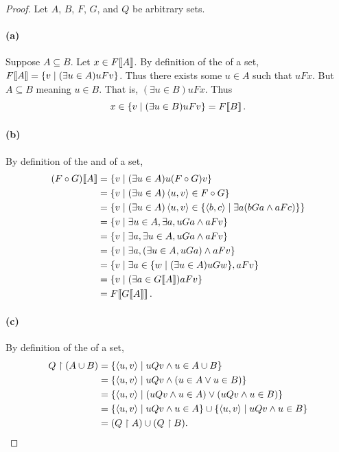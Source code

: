 \documentclass{report}
\begin{document}
  \begin{proof}
    Let $A$, $B$, $F$, $G$, and $Q$ be arbitrary sets.

    \paragraph{(a)}%

      Suppose $A \subseteq B$.
      Let $x \in F\!\left\llbracket A\right\rrbracket$.
      By definition of the  of a set,
        $F\!\left\llbracket A\right\rrbracket = \{v \mid (\exists u \in A) uFv\}$.
      Thus there exists some $u \in A$ such that $uFx$.
      But $A \subseteq B$ meaning $u \in B$.
      That is, $(\exists u \in B)uFx$.
      Thus $$x \in \{v \mid (\exists u \in B)uFv\} = F\!\left\llbracket B\right\rrbracket.$$

    \paragraph{(b)}%

      By definition of the  and  of a
        set,
        \begin{align*}
          (F \circ G)\!\left\llbracket A\right\rrbracket
            & = \{v \mid (\exists u \in A) u(F \circ G)v\} \\
            & = \{v \mid (\exists u \in A) \left< u, v \right> \in F \circ G\} \\
            & = \{v \mid (\exists u \in A)
              \left< u, v \right> \in \{\left< b, c \right> \mid
                \exists a(bGa \land aFc)\}\} \\
            & = \{v \mid \exists u \in A, \exists a, uGa \land aFv\} \\
            & = \{v \mid \exists a, \exists u \in A, uGa \land aFv\} \\
            & = \{v \mid \exists a, (\exists u \in A, uGa) \land aFv\} \\
            & = \{v \mid \exists a \in \{w \mid (\exists u \in A)uGw\}, aFv\} \\
            & = \{v \mid (\exists a \in G\!\left\llbracket A\right\rrbracket) aFv\} \\
            & = F\!\left\llbracket G\!\left\llbracket A\right\rrbracket\right\rrbracket.
        \end{align*}

    \paragraph{(c)}%

      By definition of the  of a set,
        \begin{align*}
          Q \restriction (A \cup B)
            & = \{\left< u, v \right> \mid uQv \land u \in A \cup B\} \\
            & = \{\left< u, v \right> \mid uQv \land (u \in A \lor u \in B)\} \\
            & = \{\left< u, v \right> \mid
              (uQv \land u \in A) \lor (uQv \land u \in B)\} \\
            & = \{\left< u, v \right> \mid uQv \land u \in A\} \cup
              \{\left< u, v \right> \mid uQv \land u \in B\} \\
            & = (Q \restriction A) \cup (Q \restriction B).
        \end{align*}


\end{proof}
\end{document}
